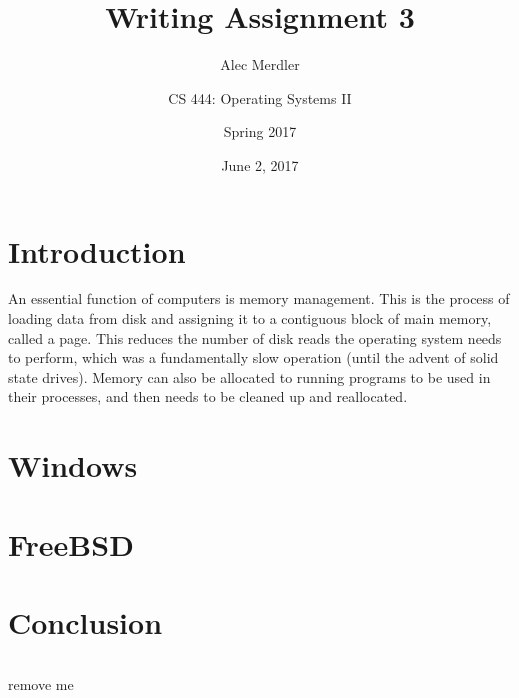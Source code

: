 \documentclass[letterpaper,draftclsnofoot,10pt,onecolumn,titlepage]{IEEEtran}\usepackage[margin=0.75in]{geometry}
\title{Writing Assignment 3}
\author{
	Alec Merdler\\
	\and
	CS 444: Operating Systems II\\
	\and
	Spring 2017\\
}
\date{June 2, 2017}
\begin{document}
\begin{titlepage}
\clearpage\maketitle
\thispagestyle{empty}

\maketitle
\end{titlepage}

\section{Introduction}
An essential function of computers is memory management. This is the process of loading data from disk and assigning
it to a contiguous block of main memory, called a page. This reduces the number of disk reads the operating system 
needs to perform, which was a fundamentally slow operation (until the advent of solid state drives). Memory can 
also be allocated to running programs to be used in their processes, and then needs to be cleaned up and 
reallocated.

\section{Windows}


\section{FreeBSD}


\section{Conclusion}


\begin{lstlisting}[language=C++]

\end{lstlisting}


remove me\cite{Windows}


\end{document}
